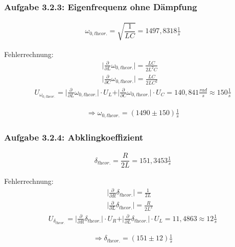 \documentclass[a4paper]{scrartcl}
\numberwithin{equation}{subsection}
\begin{document}
\subsubsection{Aufgabe 3.2.3: Eigenfrequenz ohne Dämpfung}

\begin{align}
\omega_{0,\textit{theor.}} = \sqrt{\dfrac{1}{LC}}= 1497,8318 \frac{1}{s}
\end{align}

Fehlerrechnung:
\begin{align*}
\vert \frac{\partial}{\partial L}\omega_{0,\textit{theor.}}\vert = \frac{LC}{2L^2C} &\\
\vert \frac{\partial}{\partial C}\omega_{0,\textit{theor.}}\vert = \frac{LC}{2LC^2} &
\end{align*}
\begin{align*}
U_{\omega_{0,\textit{theor.}}} = \vert \frac{\partial}{\partial L}\omega_{0,\textit{theor.}}\vert \cdot U_L + \vert \frac{\partial}{\partial C}\omega_{0,\textit{theor.}}\vert \cdot U_C = 140,841 \frac{rad}{s} \approx 150 \frac{1}{s}
\end{align*}

\begin{align*}
\Rightarrow \omega_{0,\textit{theor.}} = (1490 \pm 150) \frac{1}{s}
\end{align*}

\subsubsection{Aufgabe 3.2.4: Abklingkoeffizient}

\begin{align}
\delta_{\textit{theor.}} = \dfrac{R}{2L}= 151,3453 \frac{1}{s}
\end{align}

Fehlerrechnung:
\begin{align*}
\vert \frac{\partial}{\partial R}\delta_{\textit{theor.}}\vert = \frac{1}{2L} &\\
\vert \frac{\partial}{\partial L}\delta_{\textit{theor.}}\vert = \frac{R}{2L^2} &
\end{align*}
\begin{align*}
U_{\delta_{\textit{theor.}}} = \vert \frac{\partial}{\partial R}\delta_{\textit{theor.}}\vert \cdot U_R + \vert \frac{\partial}{\partial L}\delta_{\textit{theor.}}\vert \cdot U_L = 11,4863 \approx 12  \frac{1}{s}
\end{align*}

\begin{align*}
\Rightarrow \delta_{\textit{theor.}} = (151 \pm 12) \frac{1}{s}
\end{align*}
\end{document}
